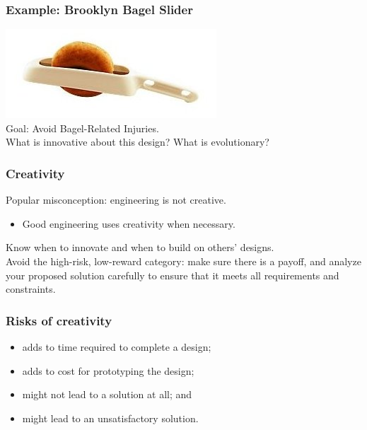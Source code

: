 \begin{frame}
\frametitle{Example: Brooklyn Bagel Slider}

\begin{changemargin}{1cm}
\includegraphics[width=.8\textwidth]{images/bbs.jpg}\\[1em]

Goal: Avoid Bagel-Related Injuries.\\[1em]

\alert{What is innovative about this design? What is evolutionary?}
\end{changemargin}
\end{frame}

\begin{frame}
\frametitle{Creativity}

\begin{changemargin}{1cm}
Popular misconception: engineering is not creative.

\begin{itemize}
\item Good engineering uses creativity
when necessary.
\end{itemize}

Know when to innovate and when to build on others' designs.\\[1em]

Avoid the high-risk, low-reward category: make sure there is a payoff,
and analyze your proposed solution carefully to ensure that it meets
all requirements and constraints.
\end{changemargin}

\end{frame}

\begin{frame}

\frametitle{Risks of creativity}

\large
\begin{changemargin}{1cm}
\begin{itemize}
\item adds to time required to complete a design; 
\item adds to cost for prototyping the design;
\item might not lead to a solution at all; and
\item might lead to an unsatisfactory solution.
\end{itemize}
\end{changemargin}

\end{frame}


